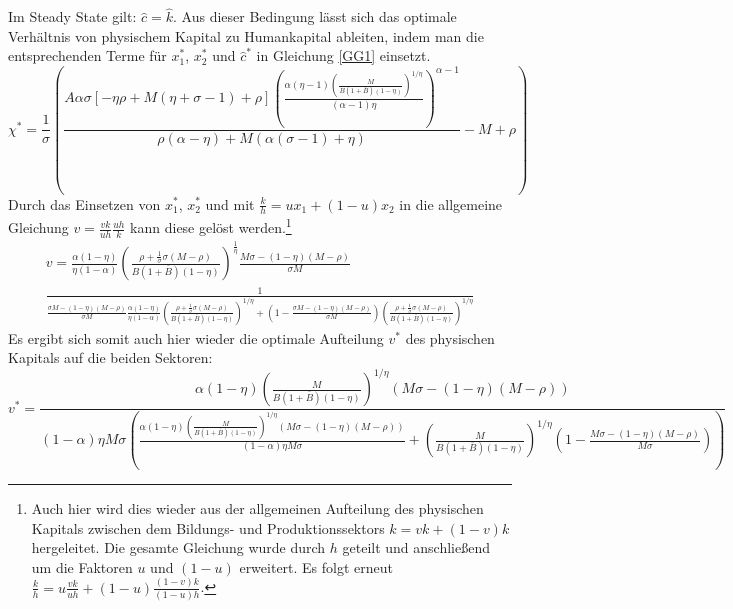 Im Steady State gilt: $\hat{c}=\hat{k}$. Aus dieser Bedingung lässt sich das optimale Verhältnis von physischem Kapital zu Humankapital ableiten, indem man die entsprechenden Terme für $x_1^*$, $x_2^*$ und $\hat{c}^*$  in Gleichung \eqref{GG1} einsetzt. 
\begin{equation}
\boxed{\chi^*=\frac{1}{\sigma}\left(\frac{A\alpha \sigma[-\eta\rho+M(\eta+\sigma-1)+\rho] \left(\frac{\alpha  (\eta -1) \left(\frac{M}{B (1+\bar{B})(1-\eta) }\right)^{1/\eta }}{(\alpha -1) \eta }\right)^{\alpha -1}}{\rho  (\alpha -\eta )+M (\alpha  (\sigma -1)+\eta )}-M+\rho\right)}
\end{equation}
Durch das Einsetzen von $x_1^*$, $x_2^*$ und mit $\frac{k}{h}=u x_1+(1-u)x_2$ in die allgemeine Gleichung $v=\frac{vk}{uh}\frac{uh}{k}$ kann diese gelöst werden.\footnote{Auch hier wird dies wieder aus der allgemeinen Aufteilung des physischen Kapitals zwischen dem Bildungs- und Produktionssektors $k=vk+(1-v)k$ hergeleitet. Die gesamte Gleichung wurde durch $h$ geteilt und anschlie{\ss}end um die Faktoren $u$ und $(1-u)$ erweitert. Es folgt erneut $\frac{k}{h}=u\frac{vk}{uh}+(1-u)\frac{(1-v)k}{(1-u)h}$.}
\begin{equation}
\begin{split}
v=\frac{\alpha(1-\eta)}{\eta(1-\alpha)} \left(\frac{\rho+\frac{1}{\sigma} \sigma(M-\rho)}{B (1+\bar{B}) (1-\eta )}\right)^{\frac{1}{\eta}} \frac{M \sigma -(1-\eta ) (M-\rho )}{ \sigma M}\\
\frac{1}{\frac{ \sigma M -(1-\eta ) (M-\rho )}{\sigma M }\frac{\alpha(1-\eta)}{\eta(1-\alpha)}\left(\frac{\rho+\frac{1}{\sigma}\sigma(M-\rho )}{B (1+\bar{B}) (1-\eta )}\right)^{1/\eta }+\left(1-\frac{ \sigma M-(1-\eta ) (M-\rho )}{ \sigma M}\right) \left(\frac{\rho+\frac{1}{\sigma}\sigma(M-\rho )}{B (1+\bar{B}) (1-\eta )}\right)^{1/\eta }}
\end{split}
\end{equation}
Es ergibt sich somit auch hier wieder die optimale Aufteilung $v^*$ des physischen Kapitals auf die beiden Sektoren:
\begin{equation}
\boxed{
v^*=\frac{\alpha  (1-\eta ) \left(\frac{M}{B (1+\bar{B}) (1-\eta )}\right)^{1/\eta } (M \sigma -(1-\eta ) (M-\rho ))}{(1-\alpha ) \eta  M \sigma  \left(\frac{\alpha  (1-\eta ) \left(\frac{M}{B (1+\bar{B}) (1-\eta )}\right)^{1/\eta } (M \sigma -(1-\eta ) (M-\rho ))}{(1-\alpha ) \eta  M \sigma }+\left(\frac{M}{B (1+\bar{B}) (1-\eta )}\right)^{1/\eta } \left(1-\frac{M \sigma -(1-\eta ) (M-\rho )}{M \sigma }\right)\right)}}
\end{equation}
